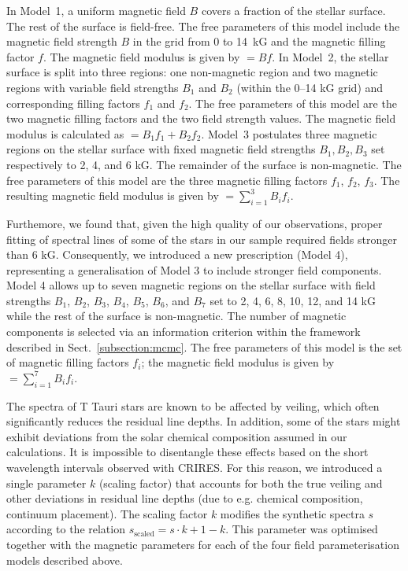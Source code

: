 \documentclass{aa}
\begin{document}
In Model~1, a uniform magnetic field $B$ covers a fraction of the stellar surface. The rest of the surface is field-free. The free parameters of this model include the magnetic field strength $B$ in the grid from 0 to 14~kG and the magnetic filling factor $f$. The magnetic field modulus is given by {\bb} $ = Bf$. In Model~2, the stellar surface is split into three regions: one non-magnetic region and two magnetic regions with variable field strengths $B_1$ and $B_2$ (within the 0--14 kG grid) and corresponding filling factors $f_1$ and $f_2$. The free parameters of this model are the two magnetic filling factors and the two field strength values. The magnetic field modulus is calculated as {\bb} $= B_1 f_1 + B_2 f_2$. Model~3 postulates three magnetic regions on the stellar surface with fixed magnetic field strengths $B_1, B_2, B_3$ set respectively to 2, 4, and 6 kG. The remainder of the surface is non-magnetic. The free parameters of this model are the three magnetic filling factors $f_1$, $f_2$, $f_3$. The resulting magnetic field modulus is given by {\bb} $= \sum_{i = 1}^{3} B_i f_i$.

Furthemore, we found that, given the high quality of our observations, proper fitting of spectral lines of some of the stars in our sample required fields stronger than 6 kG. Consequently, we introduced a new prescription (Model 4), representing a generalisation of Model 3 to include stronger field components. Model 4 allows up to seven magnetic regions on the stellar surface with field strengths $B_1$, $B_2$, $B_3$, $B_4$, $B_5$, $B_6$, and $B_7$ set to 2, 4, 6, 8, 10, 12, and 14 kG while the rest of the surface is non-magnetic. The number of magnetic components is selected via an information criterion within the framework described in Sect.~\ref{subsection:mcmc}. The free parameters of this model is the set of magnetic filling factors $f_i$; the magnetic field modulus is given by {\bb} $ = \sum_{i = 1}^{7} B_i f_i$.

The spectra of T Tauri stars are known to be affected by veiling, which often significantly reduces the residual line depths. In addition, some of the stars might exhibit deviations from the solar chemical composition assumed in our calculations. It is impossible to disentangle these effects based on the short wavelength intervals observed with CRIRES. For this reason, we introduced a single parameter $k$ (scaling factor) that accounts for both the true veiling and other deviations in residual line depths (due to e.g. chemical composition, continuum placement). The scaling factor $k$ modifies the synthetic spectra $s$ according to the relation $s_{\text{scaled}} = s \cdot k +1 -k$. This parameter was optimised together with the magnetic parameters for each of the four field parameterisation models described above.
\end{document}
